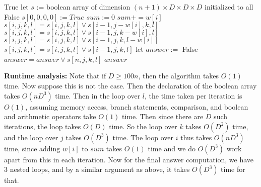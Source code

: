\documentclass[answers]{exam}
\begin{document}
\begin{questions}
\begin{solution}
        \begin{algorithmic}
                    \State \Return True
                \EndIf
                \State let $s$ := boolean array of dimension $(n + 1) \times D \times D \times D$ initialized to all False
                \State $s[0, 0, 0, 0] := True$
                \State $sum := 0$
                    \State $sum += w[i]$ 
                                    \State $s[i, j, k, l] = s[i, j, k, l] \lor s[i - 1, j - w[i], k, l]$
                                \EndIf
                                    \State $s[i, j, k, l] = s[i, j, k, l] \lor s[i - 1, j, k - w[i], l]$
                                \EndIf
                                    \State $s[i, j, k, l] = s[i, j, k, l] \lor s[i - 1, j, k, l - w[i]]$
                                \EndIf
                                    \State $s[i, j, k, l] = s[i, j, k, l] \lor s[i - 1, j, k, l]$
                                \EndIf
                            \EndFor
                        \EndFor
                    \EndFor
                \EndFor
                \State let $answer :=$ False
                                \State $answer = answer \lor s[n, j, k, l]$
                            \EndIf
                        \EndFor
                    \EndFor
                \EndFor
                \State \Return $answer$
            \EndFunction
        \end{algorithmic}

\textbf{Runtime analysis:}
Note that if $D \ge 100n$, then the algorithm takes $O(1)$ time. Now suppose this is not the case. Then the declaration of the boolean array takes $O(n D^3)$ time. Then in the loop over $l$, the time
taken per iteration is $O(1)$, assuming memory access, branch statements, comparison, and boolean and arithmetic operators take $O(1)$ time. Then since there are $D$ such iterations, the loop takes
$O(D)$ time. So the loop over $k$ takes $O(D^2)$ time, and the loop over $j$ takes $O(D^3)$ time. The loop over $i$ thus takes $O(n D^3)$ time, since adding $w[i]$ to $sum$ takes $O(1)$ time and we do
$O(D^3)$ work apart from this in each iteration. Now for the final answer computation, we have $3$ nested loops, and by a similar argument as above, it takes $O(D^3)$ time for that.


\end{solution}
\end{questions}
\end{document}
